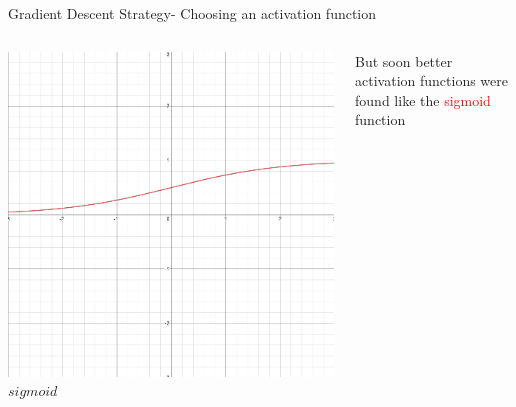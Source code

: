 \begin{frame}{Gradient Descent Strategy- Choosing an activation function}
	\begin{columns}[T]
        \begin{column}{0.5\textwidth}
        	\includegraphics[width=\textwidth]{images/sigmoid.png}
        	\tiny{\textit{$sigmoid$}}
        \end{column}
	    \begin{column}{0.5\textwidth}
    	    But soon better activation functions were found like the \textcolor{red}{sigmoid} function
    	\end{column}
    \end{columns}
\end{frame}

